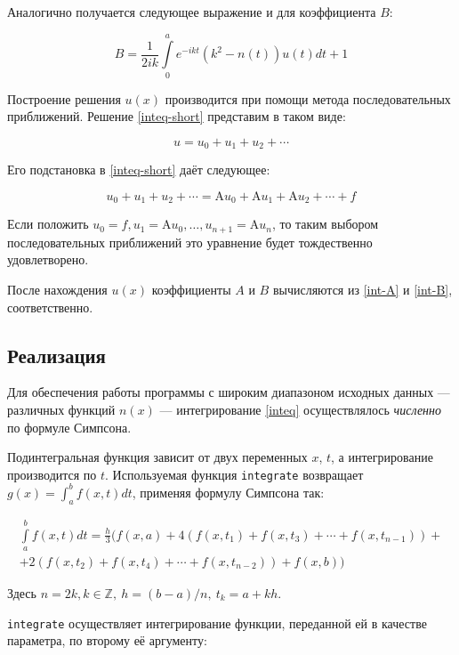 \documentclass{article}
\newcommand{\procname}[1]{\texttt{#1}}
\providecommand{\op}[1]{\mathrm{#1}}
\numberwithin{equation}{section}
\begin{document}
Аналогично получается следующее выражение и для коэффициента $B$:

\begin{equation}\label{int-B}
  B = \frac{1}{2ik} \int \limits_{0}^{a} {e^{-ikt} (k^2-n(t)) u(t) dt} + 1
\end{equation}

Построение решения $u(x)$ производится при помощи метода
последовательных приближений\nocite{polyanin03}. Решение
\eqref{inteq-short} представим в таком виде:

\[
u = u_0 + u_1 + u_2 + \dotsb
\]

Его подстановка в \eqref{inteq-short} даёт следующее:

\[
 u_0 + u_1 + u_2 + \dotsb = \op{A}u_0 + \op{A}u_1 +
 \op{A}u_2 + \dotsb + f
\]

Если положить $u_0=f, u_1=\op{A}u_0, \dotsc, u_{n+1}=\op{A} u_n$, то
таким выбором последовательных приближений это уравнение будет
тождественно удовлетворено.

После нахождения $u(x)$ коэффициенты $A$ и $B$ вычисляются из
\eqref{int-A} и \eqref{int-B}, соответственно.

\clearpage
\subsection{Реализация}

Для обеспечения работы программы с широким диапазоном исходных данных
— различных функций $n(x)$ — интегрирование \eqref{inteq}
осуществлялось \emph{численно} по формуле Симпсона.

Подинтегральная функция зависит от двух переменных $x$, $t$, а
интегрирование производится по $t$. Используемая функция
\procname{integrate} возвращает $g(x) = \int_a^b{f(x, t) dt}$,
применяя формулу Симпсона так:

\begin{equation}\label{simpson}
  \begin{split}
    \int \limits_a^b {f(x, t) dt} = \frac{h}{3}
    (f(x, a) + 4 (f(x, t_1) + f(x, t_3) + \dotsb + f(x, t_{n-1})) + \\
    + 2 (f(x, t_2) + f(x, t_4) + \dotsb + f(x, t_{n-2})) + f(x, b))
  \end{split}
\end{equation}

Здесь $n = 2k, k \in \mathbb{Z},\ h = (b-a)/n,\ t_k = a+kh$.

\procname{integrate} осуществляет интегрирование функции, переданной
ей в качестве параметра, по второму её аргументу:
\end{document}
